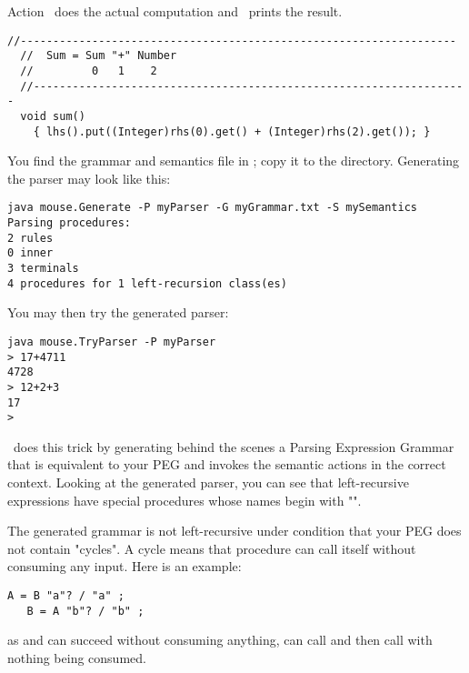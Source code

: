 \newpage
Action \Suma\ does the actual computation
and \Printa\ prints the result.

\smallskip 
\small
\begin{Verbatim}[frame=single,framesep=2mm,samepage=true,xleftmargin=15mm,xrightmargin=15mm,baselinestretch=0.8]
  //-------------------------------------------------------------------
  //  Sum = Sum "+" Number
  //         0   1    2
  //-------------------------------------------------------------------
  void sum()
    { lhs().put((Integer)rhs(0).get() + (Integer)rhs(2).get()); }
\end{Verbatim}
\normalsize

You find the grammar and semantics file in ;
copy it to the  directory.
Generating the parser may look like this:

\small
\begin{Verbatim}[samepage=true,xleftmargin=15mm,baselinestretch=0.8]
java mouse.Generate -P myParser -G myGrammar.txt -S mySemantics
Parsing procedures:
2 rules
0 inner
3 terminals
4 procedures for 1 left-recursion class(es)
\end{Verbatim}
\normalsize

You may then try the generated parser:
  
\small
\begin{Verbatim}[samepage=true,xleftmargin=15mm,baselinestretch=0.8]
java mouse.TryParser -P myParser
> 17+4711
4728
> 12+2+3
17
>
\end{Verbatim}
\normalsize

\Mouse\ does this trick by generating behind the scenes
a Parsing Expression Grammar that is equivalent to your PEG
and invokes the semantic actions in the correct context.
Looking at the generated parser, you can see that left-recursive expressions
have special procedures whose names begin with "\tx{\$}".

The generated grammar is not left-recursive 
under condition that your PEG does not contain "cycles".
A cycle means that procedure can call itself without consuming any input.
Here is an example: 

\smallskip 
\small
\begin{Verbatim}[frame=single,framesep=2mm,samepage=true,xleftmargin=15mm,xrightmargin=15mm,baselinestretch=0.8]
   A = B "a"? / "a" ;
   B = A "b"? / "b" ;
\end{Verbatim}
\normalsize

as  and  can succeed without consuming anything,
 can call 
and then call  with nothing being consumed.

